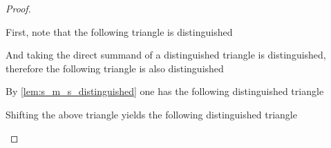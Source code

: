 \begin{proof}
\begin{enumerate}
{            First, note that the following triangle is distinguished
            \begin{center}
            \end{center}

            And taking the direct summand of a distinguished triangle is distinguished, therefore the following triangle is also distinguished
            \begin{center}
            \end{center}

            By \autoref{lem:s_m_s_distinguished} one has the following distinguished triangle
            \begin{center}
            \end{center}

            Shifting the above triangle yields the following distinguished triangle
            \begin{center}
\end{center}}
\end{enumerate}
\end{proof}
